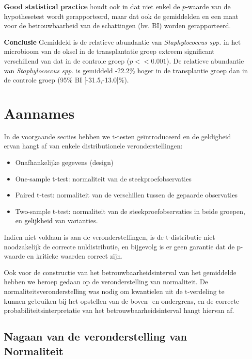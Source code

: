 \documentclass[
  dutch,
  letterpaper,
  12pt]{book}
\providecommand{\tightlist}{%
  \setlength{\itemsep}{0pt}\setlength{\parskip}{0pt}}
\theoremstyle{definition}
\theoremstyle{definition}
\theoremstyle{definition}
\theoremstyle{remark}
\begin{document}
\textbf{Good statistical practice} houdt ook in dat niet enkel de
\(p\)-waarde van de hypothesetest wordt gerapporteerd, maar dat ook de
gemiddelden en een maat voor de betrouwbaarheid van de schattingen (bv.
BI) worden gerapporteerd.

\textbf{Conclusie} Gemiddeld is de relatieve abundantie van
\emph{Staphylococcus spp.} in het microbioom van de oksel in de
transplantatie groep extreem significant verschillend van dat in de
controle groep (\(p<<0.001\)). De relatieve abundantie van
\emph{Staphylococcus spp.} is gemiddeld -22.2\% hoger in de transplantie
groep dan in de controle groep (95\% BI {[}-31.5,-13.0{]}\%).

\section{Aannames}\label{aannames}

In de voorgaande secties hebben we t-testen geïntroduceerd en de
geldigheid ervan hangt af van enkele distributionele veronderstellingen:

\begin{itemize}
\tightlist
\item
  Onafhankelijke gegevens (design)
\item
  One-sample t-test: normaliteit van de steekproefobservaties
\item
  Paired t-test: normaliteit van de verschillen tussen de gepaarde
  observaties
\item
  Two-sample t-test: normaliteit van de steekproefobservaties in beide
  groepen, en gelijkheid van varianties.
\end{itemize}

Indien niet voldaan is aan de veronderstellingen, is de t-distributie
niet noodzakelijk de correcte nuldistributie, en bijgevolg is er geen
garantie dat de p-waarde en kritieke waarden correct zijn.

Ook voor de constructie van het betrouwbaarheidsinterval van het
gemiddelde hebben we beroep gedaan op de veronderstelling van
normaliteit. De normaliteitsveronderstelling was nodig om kwantielen uit
de t-verdeling te kunnen gebruiken bij het opstellen van de boven- en
ondergrens, en de correcte probabiliteitsinterpretatie van het
betrouwbaarheidsinterval hangt hiervan af.

\subsection{Nagaan van de veronderstelling van
Normaliteit}\label{nagaan-van-de-veronderstelling-van-normaliteit}
\end{document}
